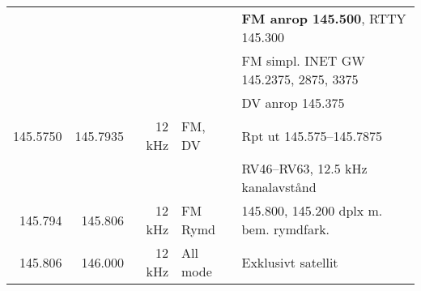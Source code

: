 {\begin{tabular}{rrrll}
         &           &         &              & \textbf{FM anrop 145.500}, RTTY 145.300 \\
         &           &         &              & FM simpl. INET GW 145.2375, 2875, 3375  \\
         &           &         &              & DV anrop 145.375                        \\ \hline
145.5750 & 145.7935  & 12 kHz  & FM, DV       & Rpt ut 145.575--145.7875                \\
         &           &         &              & RV46–RV63, 12.5 kHz kanalavstånd        \\ \hline
145.794  & 145.806   & 12 kHz  & FM Rymd      & 145.800, 145.200 dplx m. bem. rymdfark. \\ \hline
145.806  & 146.000   & 12 kHz  & All mode     & Exklusivt satellit                      \\ \hline
\end{tabular}}

